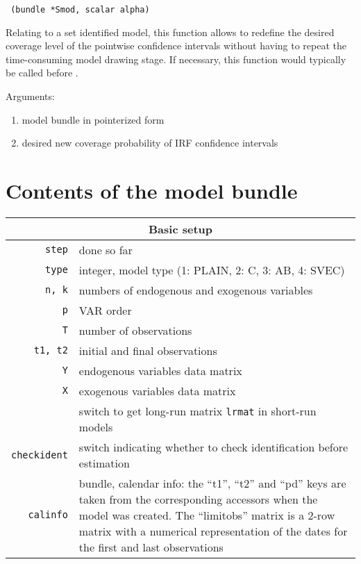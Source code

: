 \documentclass[a4paper,10pt]{article}
\newenvironment{funcdoc}[1]
{\noindent\hrulefill\newline\nopagebreak\texttt{#1}%
\nopagebreak\par\noindent\hrulefill%
\nopagebreak\par\nopagebreak\smallskip\nopagebreak\par}
{\bigskip}
\newcommand{\dtk}[1]{\texttt{\detokenize{#1}}}
\begin{document}
\begin{funcdoc}{ (bundle *Smod, scalar alpha)}
\noindent Relating to a set identified model, this function allows to redefine the 
desired coverage level of the pointwise confidence intervals without having to 
repeat the time-consuming model drawing stage. If necessary, this function would
typically be called before \dtk{SVAR_SRirf}. 

\noindent Arguments:
 
 \begin{enumerate}
 \item model bundle in pointerized form
 \item desired new coverage probability of IRF confidence intervals 
\end{enumerate}

\end{funcdoc}


\section{Contents of the model bundle}

\label{sec:bundle_struct}

  \centering
  \begin{tabular}{rp{}}
    \hline
    \multicolumn{2}{c}{\textbf{Basic setup}} \\
    \hline
    \texttt{step} & done so far \\
    \texttt{type} & integer, model type (1: PLAIN, 2: C, 3: AB, 4: SVEC)\\
    \texttt{n, k}	  & numbers of endogenous and exogenous variables \\
    \texttt{p}	  & VAR order \\
    \texttt{T}	  & number of observations \\
    \texttt{t1, t2}	  & initial and final observations \\
    \texttt{Y}	  & endogenous variables data matrix \\
    \texttt{X}	  & exogenous variables data matrix \\
    \dtk{calc_lr} & switch to get long-run matrix \texttt{lrmat} in short-run models \\ 
    \texttt{checkident} & switch indicating whether to check
                          identification before estimation\\
    \texttt{calinfo} & bundle, calendar info: the ``t1'', ``t2'' and
                       ``pd'' keys are taken from the corresponding
                       accessors when the model was created. The
                       ``limitobs'' matrix is a 2-row matrix with a
                       numerical representation of the dates for the
                       first and last observations
    \end{tabular}
    
\end{document}
